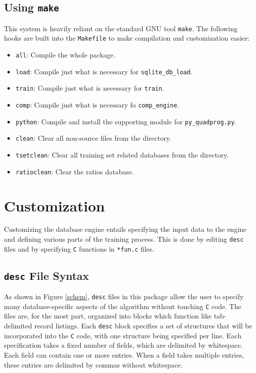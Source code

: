 \documentclass[10pt, letterpaper]{article}
\begin{document}
\subsection{Using \texttt{make}}
This system is heavily reliant on the standard GNU tool \texttt{make}. The following hooks
are built into the \texttt{Makefile} to make compilation and customization easier:
\begin{itemize}
\item \texttt{all}: Compile the whole package.
\item \texttt{load}: Compile just what is necessary for \texttt{sqlite\_db\_load}.
\item \texttt{train}: Compile just what is necessary for \texttt{train}.
\item \texttt{comp}: Compile just what is necessary fo \texttt{comp\_engine}.
\item \texttt{python}: Compile and install the supporting module for \texttt{py\_quadprog.py}.
\item \texttt{clean}: Clear all non-source files from the directory.
\item \texttt{tsetclean}: Clear all training set related databases from the directory.
\item \texttt{ratioclean}: Clear the ratios database.
\end{itemize}
\section{Customization}
Customizing the database engine entails specifying the input data to the engine and
defining various parts of the training process. This is done by editing \texttt{desc} files
and by specifying \texttt{C} functions in \texttt{*fun.c} files.
\subsection{\texttt{desc} File Syntax}
As shown in Figure \ref{schem}, \texttt{desc} files in this package allow the user to
specify many database-specific aspects of the algorithm without touching \texttt{C} code.
The files are, for the most part, organized into blocks which
function like tab-delimited record listings. Each \texttt{desc} block specifies a set of
structures that will be incorporated into the \texttt{C} code, with one structure being
specified per line. Each specification takes a fixed number of fields, which are delimited
by whitespace. Each field can contain one or more entries. When a field takes multiple
entries, these entries are delimited by commas without whitespace.
\end{document}
